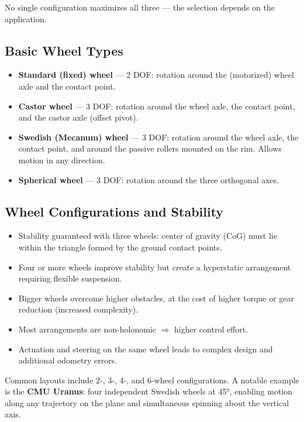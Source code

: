 \documentclass[11pt,a4paper]{article}
\theoremstyle{definition}
\theoremstyle{plain}
\theoremstyle{remark}
\begin{document}
No single configuration maximizes all three — the selection depends on the application.

\subsection{Basic Wheel Types}

\begin{itemize}
    \item \textbf{Standard (fixed) wheel} — 2 DOF: rotation around the (motorized) wheel axle and the contact point.
    \item \textbf{Castor wheel} — 3 DOF: rotation around the wheel axle, the contact point, and the castor axle (offset pivot).
    \item \textbf{Swedish (Mecanum) wheel} — 3 DOF: rotation around the wheel axle, the contact point, and around the passive rollers mounted on the rim. Allows motion in any direction.
    \item \textbf{Spherical wheel} — 3 DOF: rotation around the three orthogonal axes.
\end{itemize}

\subsection{Wheel Configurations and Stability}

\begin{itemize}
    \item Stability guaranteed with three wheels: center of gravity (CoG) must lie within the triangle formed by the ground contact points.
    \item Four or more wheels improve stability but create a hyperstatic arrangement requiring flexible suspension.
    \item Bigger wheels overcome higher obstacles, at the cost of higher torque or gear reduction (increased complexity).
    \item Most arrangements are non-holonomic $\Rightarrow$ higher control effort.
    \item Actuation and steering on the same wheel leads to complex design and additional odometry errors.
\end{itemize}

Common layouts include 2-, 3-, 4-, and 6-wheel configurations. A notable example is the \textbf{CMU Uranus}: four independent Swedish wheels at 45°, enabling motion along any trajectory on the plane and simultaneous spinning about the vertical axis.
\end{document}
